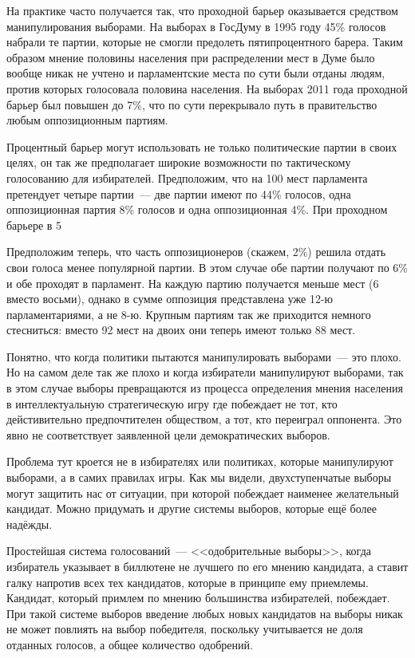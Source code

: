 На практике часто получается так, что проходной барьер оказывается средством манипулирования выборами. На выборах в ГосДуму в 1995 году 45\% голосов набрали те партии, которые не смогли предолеть пятипроцентного барера. Таким образом мнение половины населения при распределении мест в Думе было вообще никак не учтено и парламентские места по сути были отданы людям, против которых голосовала половина населения. На выборах 2011 года проходной барьер был повышен до 7\%, что по сути перекрывало путь в правительство любым оппозиционным партиям.

Процентный барьер могут использовать не только политические партии в своих целях, он так же предполагает широкие возможности по тактическому голосованию для избирателей. Предположим, что на 100 мест парламента претендует четыре партии~--- две партии имеют по 44\% голосов, одна оппозиционная партия 8\% голосов и одна оппозиционная 4\%. При проходном барьере в 5%

Предположим теперь, что часть оппозиционеров (скажем, 2\%) решила отдать свои голоса менее популярной партии. В этом случае обе партии получают по 6\% и обе проходят в парламент. На каждую партию получается меньше мест (6 вместо восьми), однако в сумме оппозиция представлена уже 12-ю парламентариями, а не 8-ю. Крупным партиям так же приходится немного стесниться: вместо 92 мест на двоих они теперь имеют только 88 мест.

Понятно, что когда политики пытаются манипулировать выборами~--- это плохо. Но на самом деле так же плохо и когда избиратели манипулируют выборами, так в этом случае выборы превращаются из процесса определения мнения населения в интеллектуальную стратегическую игру где побеждает не тот, кто дейстивительно предпочтителен обществом, а тот, кто переиграл оппонента. Это явно не соответствует заявленной цели демократических выборов.

Проблема тут кроется не в избирателях или политиках, которые манипулируют выборами, а в самих правилах игры. Как мы видели, двухступенчатые выборы могут защитить нас от ситуации, при которой побеждает наименее желательный кандидат. Можно придумать и другие системы выборов, которые ещё более надёжды.

Простейшая система голосований~--- <<одобрительные выборы>>, когда избиратель указывает в биллютене не лучшего по его мнению кандидата, а ставит галку напротив всех тех кандидатов, которые в принципе ему приемлемы. Кандидат, который примлем по мнению большинства избирателей, побеждает. При такой системе выборов введение любых новых кандидатов на выборы никак не может повлиять на выбор победителя, поскольку учитывается не доля отданных голосов, а общее количество одобрений.

